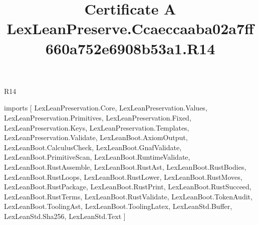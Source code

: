 \begin{lexlean}{R14}
\title{Certificate A LexLeanPreserve.Ccaeccaaba02a7ff660a752e6908b53a1.R14}
\begin{coremodule}
imports [
  LexLeanPreservation.Core,
  LexLeanPreservation.Values,
  LexLeanPreservation.Primitives,
  LexLeanPreservation.Fixed,
  LexLeanPreservation.Keys,
  LexLeanPreservation.Templates,
  LexLeanPreservation.Validate,
  LexLeanBoot.AxiomOutput,
  LexLeanBoot.CalculusCheck,
  LexLeanBoot.GnafValidate,
  LexLeanBoot.PrimitiveScan,
  LexLeanBoot.RuntimeValidate,
  LexLeanBoot.RustAssemble,
  LexLeanBoot.RustAst,
  LexLeanBoot.RustBodies,
  LexLeanBoot.RustLoops,
  LexLeanBoot.RustLower,
  LexLeanBoot.RustMoves,
  LexLeanBoot.RustPackage,
  LexLeanBoot.RustPrint,
  LexLeanBoot.RustSucceed,
  LexLeanBoot.RustTerms,
  LexLeanBoot.RustValidate,
  LexLeanBoot.TokenAudit,
  LexLeanBoot.ToolingAst,
  LexLeanBoot.ToolingLatex,
  LexLeanStd.Buffer,
  LexLeanStd.Sha256,
  LexLeanStd.Text
]


\end{coremodule}
\end{lexlean}

